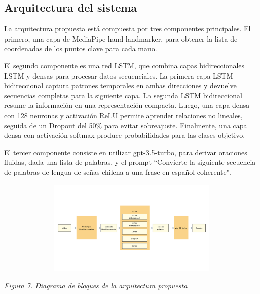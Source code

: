 \documentclass[10pt]{article}
\begin{document}
\subsection{Arquitectura del sistema}

\vspace{1\baselineskip}
La arquitectura propuesta está compuesta por tres componentes principales. El primero, una capa de MediaPipe hand landmarker, para obtener la lista de coordenadas de los puntos clave para cada mano.

\vspace{1\baselineskip}
El segundo componente es una red LSTM, que combina capas bidireccionales LSTM y densas para procesar datos secuenciales. La primera capa LSTM bidireccional captura patrones temporales en ambas direcciones y devuelve secuencias completas para la siguiente capa. La segunda LSTM bidireccional resume la información en una representación compacta. Luego, una capa densa con 128 neuronas y activación ReLU permite aprender relaciones no lineales, seguida de un Dropout del 50$\%$ para evitar sobreajuste. Finalmente, una capa densa con activación softmax produce probabilidades para las clases objetivo.

\vspace{1\baselineskip}
El tercer componente consiste en utilizar gpt-3.5-turbo, para derivar oraciones fluidas, dada una lista de palabras, y el prompt ``Convierte la siguiente secuencia de palabras de lengua de señas chilena a una frase en español coherente".

\vspace{2\baselineskip}
\begin{figure}[H]
\centering
\includegraphics[width=14.33cm,height=4.54cm]{./images/image12.png}
\end{figure}


\vspace{1\baselineskip}
\begin{center}
\textit{Figura 7. Diagrama de bloques de la arquitectura propuesta}
\end{center}
\end{document}
